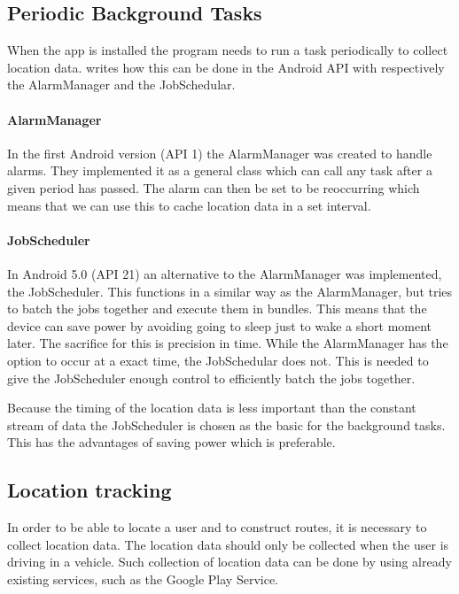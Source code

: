 \subsection{Periodic Background Tasks}\label{ssec:periodictasks}
When the app is installed the program needs to run a task periodically to collect location data.
 writes how this can be done in the Android API with respectively the AlarmManager and the JobSchedular.

\paragraph{AlarmManager}
In the first Android version (API 1) the AlarmManager was created to handle alarms.
They implemented it as a general class which can call any task after a given period has passed.
The alarm can then be set to be reoccurring which means that we can use this to cache location data in a set interval.

\paragraph{JobScheduler}
In Android 5.0 (API 21) an alternative to the AlarmManager was implemented, the JobScheduler.
This functions in a similar way as the AlarmManager, but tries to batch the jobs together and execute them in bundles.
This means that the device can save power by avoiding going to sleep just to wake a short moment later.
The sacrifice for this is precision in time. 
While the AlarmManager has the option to occur at a exact time, the JobSchedular does not.
This is needed to give the JobScheduler enough control to efficiently batch the jobs together.

Because the timing of the location data is less important than the constant stream of data the JobScheduler is chosen as the basic for the background tasks.
This has the advantages of saving power which is preferable.

\subsection{Location tracking}\label{ssec:loctrack}
In order to be able to locate a user and to construct routes, it is necessary to collect location data. 
The location data should only be collected when the user is driving in a vehicle. 
Such collection of location data can be done by using already existing services, such as the Google Play Service.

